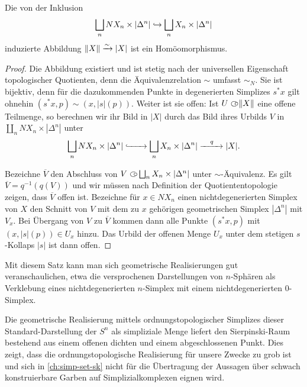 \begin{satz}
  Die von der Inklusion
  \[ \coprod_n NX_n \times |\Delta^n| \inj \coprod_n X_n \times |\Delta^n| \]
  induzierte Abbildung $\|X\| \iso |X|$ ist ein Homöomorphismus.
\end{satz}
\begin{proof}
  Die Abbildung existiert und ist stetig nach der universellen
  Eigenschaft topologischer Quotienten, denn die Äquivalenzrelation
  $\sim$ umfasst $\sim_N$. Sie ist bijektiv, denn für die
  dazukommenden Punkte in degenerierten Simplizes $s^* x$ gilt ohnehin
  $(s^* x, p) \sim (x, |s|(p))$. Weiter ist sie offen: Ist $U \open
  \|X\|$ eine offene Teilmenge, so berechnen wir ihr Bild in $|X|$
  durch das Bild ihres Urbilds $V$ in $\coprod_n NX_n \times
  |\Delta^n|$ unter
  \[ \coprod_n NX_n \times |\Delta^n|
  \xhookrightarrow{\qquad} \coprod_n X_n \times |\Delta^n|
  \xrightarrow{\quad\scriptsize{q}\quad} |X|. \]

  Bezeichne $\overline{V}$ den Abschluss von $V \open \coprod_n X_n
  \times |\Delta^n|$ unter $\sim$-Äquivalenz. Es gilt $\overline{V} =
  q^{-1}(q(V))$ und wir müssen nach Definition der Quotiententopologie
  zeigen, dass $\overline{V}$ offen ist. Bezeichne für $x \in NX_n$
  einen nichtdegenerierten Simplex von $X$ den Schnitt von $V$ mit dem
  zu $x$ gehörigen geometrischen Simplex $|\Delta^n|$ mit $V_x$. Bei
  Übergang von $V$ zu $\overline{V}$ kommen dann alle Punkte $(s^* x,
  p)$ mit $(x, |s|(p)) \in U_x$ hinzu. Das Urbild der offenen Menge
  $U_x$ unter dem stetigen $s$-Kollaps $|s|$ ist dann offen.
\end{proof}
\begin{bem} \label{real-sphere}
  Mit diesem Satz kann man sich geometrische Realisierungen gut
  veranschaulichen, etwa die versprochenen Darstellungen von
  $n$-Sphären als Verklebung eines nichtdegenerierten $n$-Simplex mit
  einem nichtdegenerierten $0$-Simplex.
\end{bem}
\begin{bsp} \label{ex:clumsy-sphere}
  Die geometrische Realisierung mittels ordnungstopologischer
  Simplizes dieser Standard-Darstellung der $S^n$ als simpliziale
  Menge liefert den Sierpinski-Raum bestehend aus einem offenen
  dichten und einem abgeschlossenen Punkt. Dies zeigt, dass die
  ordnungstopologische Realisierung für unsere Zwecke zu grob ist und
  sich in \autoref{ch:simp-set-sk} nicht für die Übertragung der
  Aussagen über schwach konstruierbare Garben auf Simplizialkomplexen
  eignen wird.
\end{bsp}

